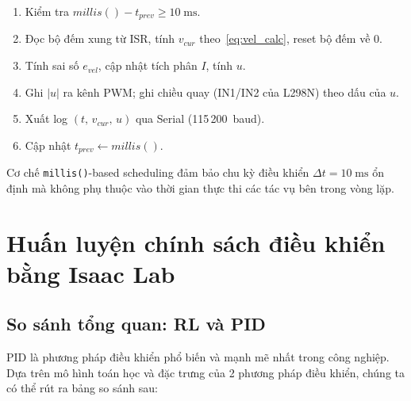 \begin{enumerate}
    \item Kiểm tra $\mathit{millis}() - t_{prev} \geq 10\;\text{ms}$.
    \item Đọc bộ đếm xung từ ISR, tính $v_{cur}$ theo~\eqref{eq:vel_calc},
    reset bộ đếm về 0.
    \item Tính sai số $e_{vel}$, cập nhật tích phân $I$, tính $u$.
    \item Ghi $|u|$ ra kênh PWM; ghi chiều quay (IN1/IN2 của L298N) theo
    dấu của $u$.
    \item Xuất log $(t,\,v_{cur},\,u)$ qua Serial (115\,200~baud).
    \item Cập nhật $t_{prev} \leftarrow \mathit{millis}()$.
\end{enumerate}

Cơ chế \texttt{millis()}-based scheduling đảm bảo chu kỳ điều khiển
$\Delta t = 10\;\text{ms}$ ổn định mà không phụ thuộc vào thời gian
thực thi các tác vụ bên trong vòng lặp.


\section{Huấn luyện chính sách điều khiển bằng Isaac Lab}
\label{sec:isaaclab_train}

\subsection{So sánh tổng quan: RL và PID}
\label{sec:rl_vs_pid}

PID là phương pháp điều khiển phổ biến và mạnh mẽ nhất trong công nghiệp. Dựa trên mô hình toán học và đặc trưng của 2 phương pháp điều khiển, chúng ta có thể rút ra bảng so sánh sau:

